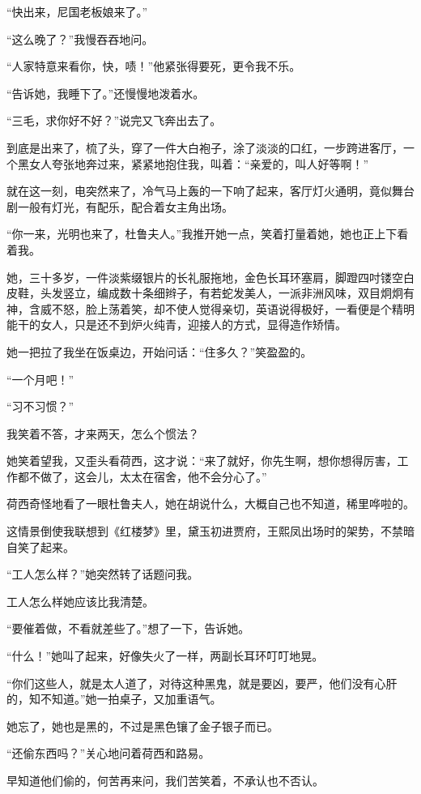 \par “快出来，尼国老板娘来了。”
\par “这么晚了？”我慢吞吞地问。
\par “人家特意来看你，快，啧！”他紧张得要死，更令我不乐。
\par “告诉她，我睡下了。”还慢慢地泼着水。
\par “三毛，求你好不好？”说完又飞奔出去了。
\par 到底是出来了，梳了头，穿了一件大白袍子，涂了淡淡的口红，一步跨进客厅，一个黑女人夸张地奔过来，紧紧地抱住我，叫着：“亲爱的，叫人好等啊！”
\par 就在这一刻，电突然来了，冷气马上轰的一下响了起来，客厅灯火通明，竟似舞台剧一般有灯光，有配乐，配合着女主角出场。
\par “你一来，光明也来了，杜鲁夫人。”我推开她一点，笑着打量着她，她也正上下看着我。
\par 她，三十多岁，一件淡紫缀银片的长礼服拖地，金色长耳环塞肩，脚蹬四吋镂空白皮鞋，头发竖立，编成数十条细辫子，有若蛇发美人，一派非洲风味，双目炯炯有神，含威不怒，脸上荡着笑，却不使人觉得亲切，英语说得极好，一看便是个精明能干的女人，只是还不到炉火纯青，迎接人的方式，显得造作矫情。
\par 她一把拉了我坐在饭桌边，开始问话：“住多久？”笑盈盈的。
\par “一个月吧！”
\par “习不习惯？”
\par 我笑着不答，才来两天，怎么个惯法？
\par 她笑着望我，又歪头看荷西，这才说：“来了就好，你先生啊，想你想得厉害，工作都不做了，这会儿，太太在宿舍，他不会分心了。”
\par 荷西奇怪地看了一眼杜鲁夫人，她在胡说什么，大概自己也不知道，稀里哗啦的。
\par 这情景倒使我联想到《红楼梦》里，黛玉初进贾府，王熙凤出场时的架势，不禁暗自笑了起来。
\par “工人怎么样？”她突然转了话题问我。
\par 工人怎么样她应该比我清楚。
\par “要催着做，不看就差些了。”想了一下，告诉她。
\par “什么！”她叫了起来，好像失火了一样，两副长耳环叮叮地晃。
\par “你们这些人，就是太人道了，对待这种黑鬼，就是要凶，要严，他们没有心肝的，知不知道。”她一拍桌子，又加重语气。
\par 她忘了，她也是黑的，不过是黑色镶了金子银子而已。
\par “还偷东西吗？”关心地问着荷西和路易。
\par 早知道他们偷的，何苦再来问，我们苦笑着，不承认也不否认。
